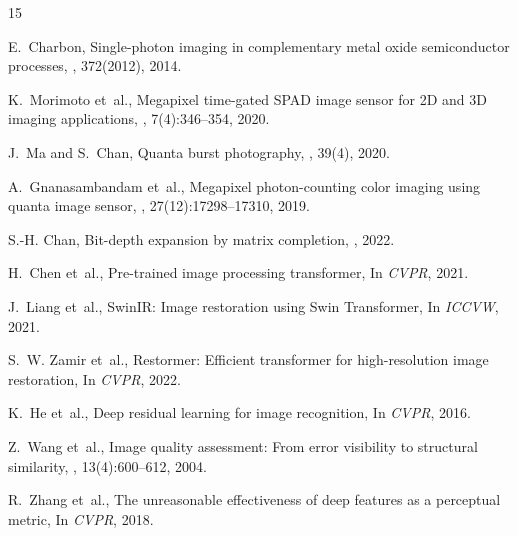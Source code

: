 \documentclass[10pt,twocolumn,letterpaper]{article}
\begin{document}
{\small


\begin{thebibliography}{15}

E.~Charbon,
\newblock Single-photon imaging in complementary metal oxide semiconductor
  processes,
, 372(2012), 2014.

K.~Morimoto et~al.,
\newblock Megapixel time-gated SPAD image sensor for 2D and 3D imaging
  applications,
, 7(4):346--354, 2020.

J.~Ma and S.~Chan,
\newblock Quanta burst photography,
, 39(4), 2020.

A.~Gnanasambandam et~al.,
\newblock Megapixel photon-counting color imaging using quanta image sensor,
, 27(12):17298--17310, 2019.

S.-H. Chan,
\newblock Bit-depth expansion by matrix completion,
, 2022.

H.~Chen et~al.,
\newblock Pre-trained image processing transformer,
\newblock In {\em CVPR}, 2021.

J.~Liang et~al.,
\newblock SwinIR: Image restoration using Swin Transformer,
\newblock In {\em ICCVW}, 2021.

S.~W. Zamir et~al.,
\newblock Restormer: Efficient transformer for high-resolution image
  restoration,
\newblock In {\em CVPR}, 2022.

K.~He et~al.,
\newblock Deep residual learning for image recognition,
\newblock In {\em CVPR}, 2016.

Z.~Wang et~al.,
\newblock Image quality assessment: From error visibility to structural
  similarity,
, 13(4):600--612, 2004.

R.~Zhang et~al.,
\newblock The unreasonable effectiveness of deep features as a perceptual
  metric,
\newblock In {\em CVPR}, 2018.

\end{thebibliography}
}
\end{document}
